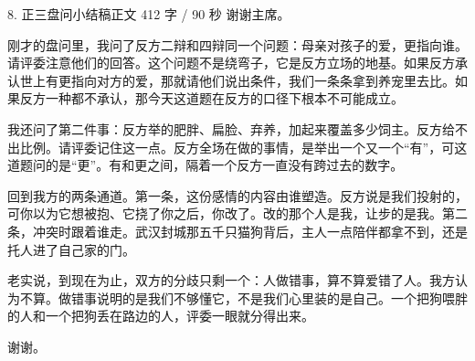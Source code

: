 \documentclass[script,pro]{debate}
\begin{document}
\begin{speech}{8. 正三盘问小结稿}{正文 412 字 / 90 秒}
谢谢主席。

刚才的盘问里，我问了反方二辩和四辩同一个问题：母亲对孩子的爱，更指向谁。请评委注意他们的回答。这个问题不是绕弯子，它是反方立场的地基。如果反方承认世上有更指向对方的爱，那就请他们说出条件，我们一条条拿到养宠里去比。如果反方一种都不承认，那今天这道题在反方的口径下根本不可能成立。

我还问了第二件事：反方举的肥胖、扁脸、弃养，加起来覆盖多少饲主。反方给不出比例。请评委记住这一点。反方全场在做的事情，是举出一个又一个“有”，可这道题问的是“更”。有和更之间，隔着一个反方一直没有跨过去的数字。

回到我方的两条通道。第一条，这份感情的内容由谁塑造。反方说是我们投射的，可你以为它想被抱、它挠了你之后，你改了。改的那个人是我，让步的是我。第二条，冲突时跟着谁走。武汉封城那五千只猫狗背后，主人一点陪伴都拿不到，还是托人进了自己家的门。

老实说，到现在为止，双方的分歧只剩一个：人做错事，算不算爱错了人。我方认为不算。做错事说明的是我们不够懂它，不是我们心里装的是自己。一个把狗喂胖的人和一个把狗丢在路边的人，评委一眼就分得出来。

谢谢。

\begin{contingency}
\end{contingency}
\end{speech}
\end{document}
